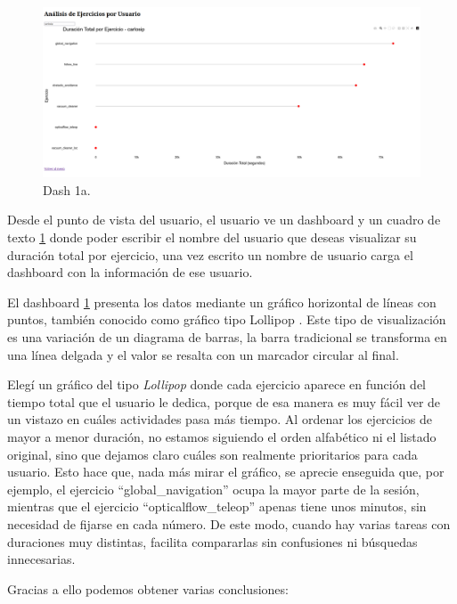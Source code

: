 \documentclass[a4paper, 12pt]{book}
\begin{document}
\begin{figure}
  \centering
  \includegraphics[width=1.1\textwidth]{img/1a.png}
  \caption{Dash 1a.}\label{fig:1a}
\end{figure}

Desde el punto de vista del usuario, el usuario ve un dashboard y un cuadro de texto \ref{fig:1a} donde poder escribir el nombre del usuario que deseas visualizar su duración total por ejercicio, una vez escrito un nombre de usuario carga el dashboard con la información de ese usuario.

El dashboard \ref{fig:1a} presenta los datos mediante un gráfico horizontal de líneas con puntos, también conocido como gráfico tipo Lollipop . Este tipo de visualización es una variación de un diagrama de barras, la barra tradicional se transforma en una línea delgada y el valor se resalta con un marcador circular al final.

Elegí un gráfico del tipo \textit{Lollipop} donde cada ejercicio aparece en función del tiempo total que el usuario le dedica, porque de esa manera es muy fácil ver de un vistazo en cuáles actividades pasa más tiempo. Al ordenar los ejercicios de mayor a menor duración, no estamos siguiendo el orden alfabético ni el listado original, sino que dejamos claro cuáles son realmente prioritarios para cada usuario. Esto hace que, nada más mirar el gráfico, se aprecie enseguida que, por ejemplo, el ejercicio “global\_navigation” ocupa la mayor parte de la sesión, mientras que el ejercicio “opticalflow\_teleop” apenas tiene unos minutos, sin necesidad de fijarse en cada número. De este modo, cuando hay varias tareas con duraciones muy distintas, facilita compararlas sin confusiones ni búsquedas innecesarias.

Gracias a ello podemos obtener varias conclusiones:
\end{document}
